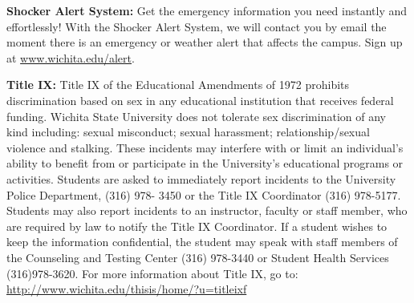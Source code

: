 \documentclass[11pt, a4paper]{article}
\begin{document}
\vspace*{.15in}
\noindent\textbf{Shocker Alert System:}
Get the emergency information you need instantly and effortlessly! With the Shocker Alert System, we will contact you by email the moment there is an emergency or weather alert that affects the campus.  Sign up at \url{www.wichita.edu/alert}.

\vspace*{.15in}
\noindent\textbf{Title IX:}
Title IX of the Educational Amendments of 1972 prohibits discrimination based on sex in any educational institution that receives federal funding. Wichita State University does not tolerate sex discrimination of any kind including: sexual misconduct; sexual harassment; relationship/sexual violence and stalking.  These incidents may interfere with or limit an individual’s ability to benefit from or participate in the University’s educational programs or activities. Students are asked to immediately report incidents to the University Police Department, (316) 978- 3450 or the Title IX Coordinator (316) 978-5177. Students may also report incidents to an instructor, faculty or staff member, who are required by law to notify the Title IX Coordinator. If a student wishes to keep the information confidential, the student may speak with staff members of the Counseling and Testing Center (316) 978-3440 or Student Health Services (316)978-3620. For more information about Title IX, go to: \url{http://www.wichita.edu/thisis/home/?u=titleixf}

\end{document}
